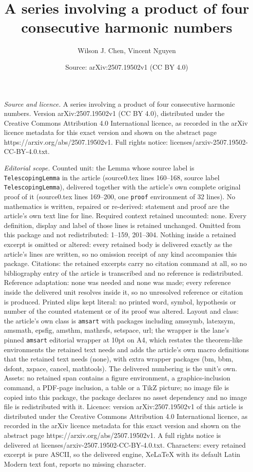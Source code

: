 \documentclass[10pt,a4paper]{amsart}
\title[A series involving a product of four consecutive harmonic nu]{A series involving a product of four consecutive harmonic numbers}
\author{Wilson J. Chen, Vincent Nguyen}
\date{Source: arXiv:2507.19502v1 (CC BY 4.0)}
\begin{document}
\maketitle

\noindent\emph{Source and licence.} A series involving a product of four consecutive harmonic numbers. Version arXiv:2507.19502v1 (CC BY 4.0), distributed under the Creative Commons Attribution 4.0 International licence, as recorded in the arXiv licence metadata for this exact version and shown on the abstract page https://arxiv.org/abs/2507.19502v1. Full rights notice: licenses/arxiv-2507.19502-CC-BY-4.0.txt.\par\smallskip

\noindent\textit{Editorial scope.} Counted unit: the Lemma whose source label is \texttt{TelescopingLemma} in the article (source0.tex lines 160--168, source label \texttt{TelescopingLemma}), delivered together with the article's own complete original proof of it (source0.tex lines 169--200, one \texttt{proof} environment of 32 lines). No mathematics is written, repaired or re-derived: statement and proof are the article's own text line for line. Required context retained uncounted: none. Every definition, display and label of those lines is retained unchanged. Omitted from this package and not redistributed: 1--159, 201--304. Nothing inside a retained excerpt is omitted or altered: every retained body is delivered exactly as the article's lines are written, so no omission receipt of any kind accompanies this package. Citations: the retained excerpts carry no citation command at all, so no bibliography entry of the article is transcribed and no reference is redistributed. Reference adaptation: none was needed and none was made; every reference inside the delivered unit resolves inside it, so no unresolved reference or citation is produced. Printed slips kept literal: no printed word, symbol, hypothesis or number of the counted statement or of its proof was altered. Layout and class: the article's own class is \texttt{amsart} with packages including amssymb, latexsym, amsmath, epsfig, amsthm, mathrsfs, setspace, url; the wrapper is the lane's pinned \texttt{amsart} editorial wrapper at 10pt on A4, which restates the theorem-like environments the retained text needs and adds the article's own macro definitions that the retained text needs (none), with extra wrapper packages (bm, bbm, dsfont, xspace, cancel, mathtools). The delivered numbering is the unit's own. Assets: no retained span contains a figure environment, a graphics-inclusion command, a PDF-page inclusion, a table or a TikZ picture; no image file is copied into this package, the package declares no asset dependency and no image file is redistributed with it. Licence: version arXiv:2507.19502v1 of this article is distributed under the Creative Commons Attribution 4.0 International licence, as recorded in the arXiv licence metadata for this exact version and shown on the abstract page https://arxiv.org/abs/2507.19502v1. A full rights notice is delivered at licenses/arxiv-2507.19502-CC-BY-4.0.txt. Characters: every retained excerpt is pure ASCII, so the delivered engine, XeLaTeX with its default Latin Modern text font, reports no missing character.
\end{document}
